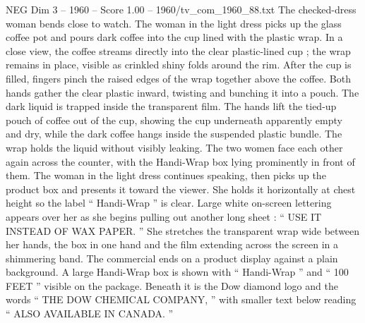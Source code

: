 \begin{textsample}{NEG Dim 3 – 1960 – Score 1.00 – 1960/tv\_com\_1960\_88.txt}
The checked-dress woman bends close to watch.
The woman in the light dress picks up the glass coffee pot and pours dark coffee into the cup lined with the plastic wrap.
In a close view, the coffee streams directly into the clear plastic-lined cup ; the wrap remains in place, visible as crinkled shiny folds around the rim.
After the cup is filled, fingers pinch the raised edges of the wrap together above the coffee.
Both hands gather the clear plastic inward, twisting and bunching it into a pouch.
The dark liquid is trapped inside the transparent film.
The hands lift the tied-up pouch of coffee out of the cup, showing the cup underneath apparently empty and dry, while the dark coffee hangs inside the suspended plastic bundle.
The wrap holds the liquid without visibly leaking.
The two women face each other again across the counter, with the Handi-Wrap box lying prominently in front of them.
The woman in the light dress continues speaking, then picks up the product box and presents it toward the viewer.
She holds it horizontally at chest height so the label “ Handi-Wrap ” is clear.
Large white on-screen lettering appears over her as she begins pulling out another long sheet : “ USE IT INSTEAD OF WAX PAPER. ” She stretches the transparent wrap wide between her hands, the box in one hand and the film extending across the screen in a shimmering band.
The commercial ends on a product display against a plain background.
A large Handi-Wrap box is shown with “ Handi-Wrap ” and “ 100 FEET ” visible on the package.
Beneath it is the Dow diamond logo and the words “ THE DOW CHEMICAL COMPANY, ” with smaller text below reading “ ALSO AVAILABLE IN CANADA. ”

\end{textsample}
